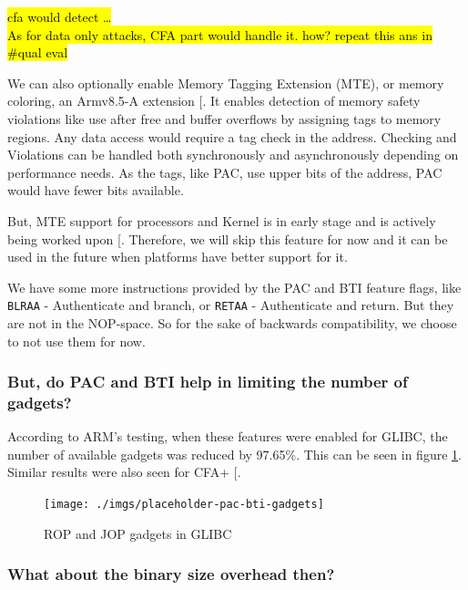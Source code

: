 \documentclass[a4paper, nobind]{templates/ociamthesis}
\begin{document}
\hl{cfa would detect \ldots{}\\
As for data only attacks, CFA part would handle it. how? repeat this ans in \#qual eval}

We can also optionally enable Memory Tagging Extension (MTE), or memory coloring,
an Armv8.5-A extension {[}\citeproc{ref-arm-pacbti}{9}{]}. It enables detection of memory safety violations like use after free
and buffer overflows by assigning tags to memory regions. Any data access would
require a tag check in the address. Checking and Violations can be handled both
synchronously and asynchronously depending on performance needs.
As the tags, like PAC, use upper bits of the address, PAC would have fewer bits available.

But, MTE support for processors and Kernel is in early stage and is actively being worked upon {[}\citeproc{ref-mte-kern-patch}{57}{]}.
Therefore, we will skip this feature for now and it can be used in the future when platforms
have better support for it.

We have some more instructions provided by the PAC and BTI feature flags,
like \texttt{BLRAA} - Authenticate and branch, or \texttt{RETAA} - Authenticate and return.
But they are not in the NOP-space. So for the sake of backwards compatibility,
we choose to not use them for now.

\subsubsection{But, do PAC and BTI help in limiting the number of gadgets?}\label{but-do-pac-and-bti-help-in-limiting-the-number-of-gadgets}

According to ARM's testing, when these features were enabled for GLIBC, the number
of available gadgets was reduced by 97.65\%. This can be seen in figure \ref{fig:pac-bti-gadgets}.
Similar results were also seen for CFA+ {[}\citeproc{ref-cfaplus}{4}{]}.

\begin{figure}

{\centering \texttt{[image: ./imgs/placeholder-pac-bti-gadgets]} 

}

\caption{ROP and JOP gadgets in GLIBC}\label{fig:pac-bti-gadgets}
\end{figure}

\subsubsection{What about the binary size overhead then?}\label{what-about-the-binary-size-overhead-then}
\end{document}
